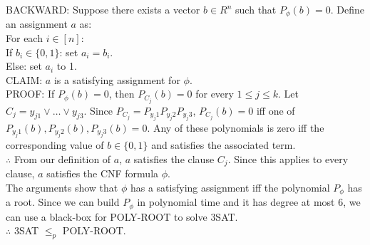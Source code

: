 \documentclass[10pt,letterpaper]{article}
\newcommand\tab[1][0.5cm]{\hspace*{#1}}
\begin{document}
\tab \textsc{BACKWARD}: Suppose there exists a vector $b \in R^n$ such that $P_{\phi}(b)=0$. Define an assignment $a$ as:\\
\tab For each $i \in [n]$:\\
\tab \tab If $b_i \in \{0,1\}$: set $a_i=b_i$.\\
\tab \tab Else: set $a_i$ to 1.\\
\tab \textsc{CLAIM:} $a$ is a satisfying assignment for $\phi$.\\
\tab \textsc{PROOF:} If $P_{\phi}(b)=0$, then $P_{C_j}(b)=0$ for every $1 \leq j \leq k$. Let $C_j=y_{j1}\vee \dots \vee y_{j3}$. Since $P_{C_j} = P_{y_j1}P_{y_j2}P_{y_j3}$, $P_{C_j}(b)=0$ iff one of $P_{y_j1}(b),P_{y_j2}(b),P_{y_j3}(b)=0$. Any of these polynomials is zero iff the corresponding value of $b \in \{0,1\}$ and satisfies the associated term.\\
\tab $\therefore$ From our definition of $a$, $a$ satisfies the clause $C_j$. Since this applies to every clause, $a$ satisfies the CNF formula $\phi$.\\
The arguments show that $\phi$ has a satisfying assignment iff the polynomial $P_{\phi}$ has a root. Since we can build $P_{\phi}$ in polynomial time and it has degree at most 6, we can use a black-box for \textsc{POLY-ROOT} to solve \textsc{3SAT}.\\
$\therefore$ \textsc{3SAT} $\leq_p$ \textsc{POLY-ROOT}.\\
\end{document}

